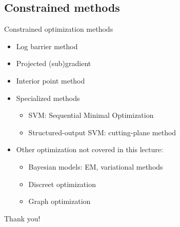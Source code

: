 \documentclass[notes]{beamer}
\newcommand{\chuhao}{\fontsize{44.9pt}{\baselineskip}\selectfont}
\begin{document}
\subsection{Constrained methods}
\begin{frame}{Constrained optimization methods}
	\begin{itemize}
		\item Log barrier method
		\item Projected (sub)gradient
		\item Interior point method
		\item Specialized methods
		      \begin{itemize}
			      \item SVM: Sequential Minimal Optimization
			      \item Structured-output SVM: cutting-plane method
		      \end{itemize}
		\item Other optimization not covered in this lecture:
		      \begin{itemize}
			      \item Bayesian models: EM, variational methods
			      \item Discreet optimization
			      \item Graph optimization
		      \end{itemize}
	\end{itemize}
\end{frame}

%
%

\begin{frame}
	\chuhao Thank you! %
\end{frame}
\end{document}
